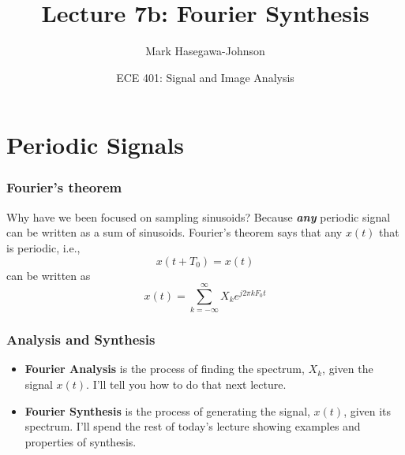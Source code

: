 \documentclass{beamer}
\title{Lecture 7b: Fourier Synthesis}
\author{Mark Hasegawa-Johnson}
\date{ECE 401: Signal and Image Analysis}
\begin{document}
\begin{frame}
  \maketitle
\end{frame}

\begin{frame}
  \tableofcontents
\end{frame}

\section[Periodic]{Periodic Signals}
\setcounter{subsection}{1}

\begin{frame}
  \frametitle{Fourier's theorem}

  Why have we been focused on sampling sinusoids?  Because  {\bf\em any} periodic
  signal can be written as a sum of sinusoids.  Fourier's theorem says that
  any $x(t)$ that is periodic, i.e.,
  \[
  x(t+T_0) = x(t)
  \]
  can be written as
  \[
  x(t) = \sum_{k=-\infty}^\infty X_k e^{j2\pi k F_0 t}
  \]
\end{frame}

\begin{frame}
  \frametitle{Analysis and Synthesis}

  \begin{itemize}
  \item {\bf Fourier Analysis} is the process of finding the spectrum,
    $X_k$, given the signal $x(t)$.  I'll tell you how to do that next lecture.
  \item {\bf Fourier Synthesis} is the process of generating the
    signal, $x(t)$, given its spectrum.  I'll spend the rest of
    today's lecture showing examples and properties of synthesis.
  \end{itemize}
\end{frame}

\end{document}
